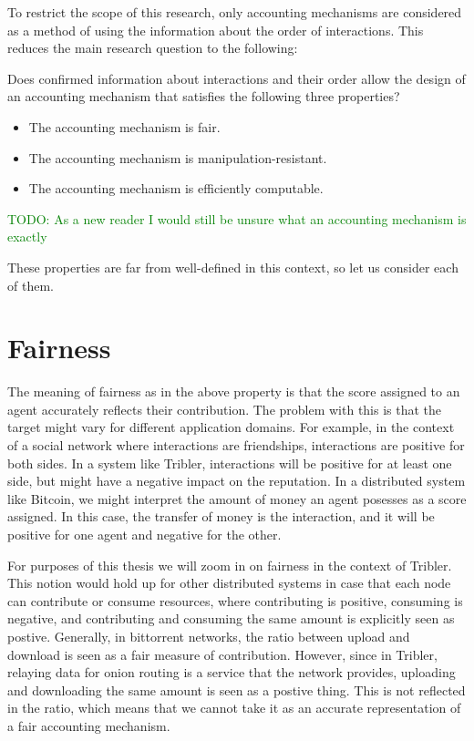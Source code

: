 \documentclass[a4paper,11pt]{book}
\newcommand\suggestion[1]{\textcolor{green}{TODO: #1}}
\theoremstyle{definition}
\begin{document}
To restrict the scope of this research, only accounting mechanisms are considered as a method
of using the information about the order of interactions. This reduces the main research question
to the following:

\begin{center}
    Does confirmed information about interactions and their order allow the design of an accounting mechanism
    that satisfies the following three properties?
\end{center}

\begin{itemize}
    \item The accounting mechanism is fair. 
    \item The accounting mechanism is manipulation-resistant.
    \item The accounting mechanism is efficiently computable.
\end{itemize}

\suggestion{As a new reader I would still be unsure what an accounting mechanism is exactly}

These properties are far from well-defined in this context, so let us consider each of them.

\section{Fairness}

The meaning of fairness as in the above property is that the score assigned to an agent
accurately reflects their contribution. The problem with this is that the target might
vary for different application domains. For example, in the context of a social
network where interactions are friendships, interactions are positive for both sides.
In a system like Tribler, interactions will be positive for at least one side, but
might have a negative impact on the reputation. In a distributed system like Bitcoin,
we might interpret the amount of money an agent posesses as a score assigned. In
this case, the transfer of money is the interaction, and it will be positive for one
agent and negative for the other.

For purposes of this thesis we will zoom in on fairness in the context of Tribler.
This notion would hold up for other distributed systems in case that each node
can contribute or consume resources, where contributing is positive, consuming
is negative, and contributing and consuming the same amount is explicitly seen as postive.
Generally, in bittorrent networks, the ratio between upload and download is seen
as a fair measure of contribution. However, since in Tribler, relaying data for onion
routing is a service that the network provides, uploading and downloading the same
amount is seen as a postive thing. This is not reflected in the ratio, which
means that we cannot take it as an accurate representation of a fair accounting mechanism.
\end{document}
